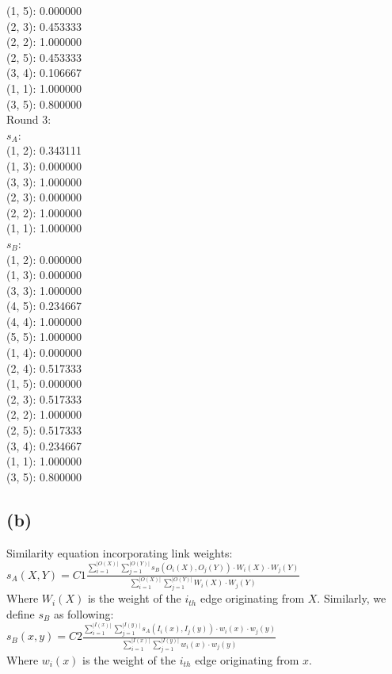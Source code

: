 \documentclass{article}
\newenvironment{myenv}[1]
  {\begin{spacing}{#1}}
  {\end{spacing}}
\begin{document}
\begin{myenv}{0.8}
(1, 5): 0.000000 \\
(2, 3): 0.453333 \\
(2, 2): 1.000000 \\
(2, 5): 0.453333 \\
(3, 4): 0.106667 \\
(1, 1): 1.000000 \\
(3, 5): 0.800000 \\
Round 3:\\ 
$s_A$:\\
(1, 2): 0.343111 \\
(1, 3): 0.000000 \\
(3, 3): 1.000000 \\
(2, 3): 0.000000 \\
(2, 2): 1.000000 \\
(1, 1): 1.000000 \\
$s_B$:\\
(1, 2): 0.000000 \\
(1, 3): 0.000000 \\
(3, 3): 1.000000 \\
(4, 5): 0.234667 \\
(4, 4): 1.000000 \\
(5, 5): 1.000000 \\
(1, 4): 0.000000 \\
(2, 4): 0.517333 \\
(1, 5): 0.000000 \\
(2, 3): 0.517333 \\
(2, 2): 1.000000 \\
(2, 5): 0.517333 \\
(3, 4): 0.234667 \\
(1, 1): 1.000000 \\
(3, 5): 0.800000 \\
\end{myenv}

\subsection{(b)}
Similarity equation incorporating link weights:\\
$s_A(X, Y) = C1\frac{ 
  \sum\limits_{i=1}^{|O(X)|} \sum\limits_{j=1}^{|O(Y)|} 
    s_B(O_i(X), O_j(Y))\cdot W_i(X)\cdot W_j(Y)
  }{
   \sum\limits_{i=1}^{|O(X)|} \sum\limits_{j=1}^{|O(Y)|}
    W_i(X)\cdot W_j(Y)
  } $ \\
Where $W_i(X)$ is the weight of the $i_{th}$ edge originating from $X$.
Similarly, we define $s_B$ as following: \\
$s_B(x, y) = C2\frac{ 
  \sum\limits_{i=1}^{|I(x)|} \sum\limits_{j=1}^{|I(y)|} 
    s_A(I_i(x), I_j(y))\cdot w_i(x)\cdot w_j(y)
  }{
    \sum\limits_{i=1}^{|I(x)|} \sum\limits_{j=1}^{|I(y)|} 
    w_i(x)\cdot w_j(y)
  } $ \\
Where $w_i(x)$ is the weight of the $i_{th}$ edge originating from $x$.
\end{document}
